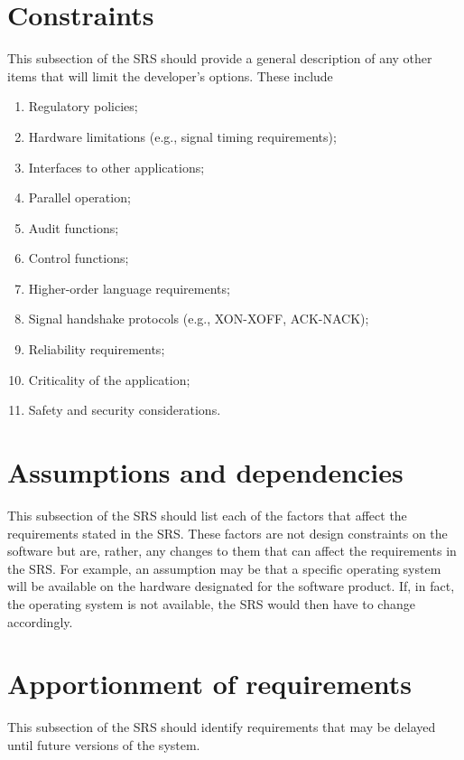 \documentclass{scrreprt}
\begin{document}
\section{Constraints}
This subsection of the SRS should provide a general description of any other
items that will limit the developer's options. These include
\begin{enumerate}
	\item Regulatory policies;
	\item Hardware limitations (e.g., signal timing requirements);
	\item Interfaces to other applications;
	\item Parallel operation;
	\item Audit functions;
	\item Control functions;
	\item Higher-order language requirements;
	\item Signal handshake protocols (e.g., XON-XOFF, ACK-NACK);
	\item Reliability requirements;
	\item Criticality of the application;
	\item Safety and security considerations.
\end{enumerate}

\section{Assumptions and dependencies}
This subsection of the SRS should list each of the factors that affect the
requirements stated in the SRS. These factors are not design constraints on the
software but are, rather, any changes to them that can affect the requirements
in the SRS. For example, an assumption may be that a specific operating system
will be available on the hardware designated for the software product. If, in
fact, the operating system is not available, the SRS would then have to change
accordingly.

\section{Apportionment of requirements}
This subsection of the SRS should identify requirements that may be delayed
until future versions of the system.
\end{document}

